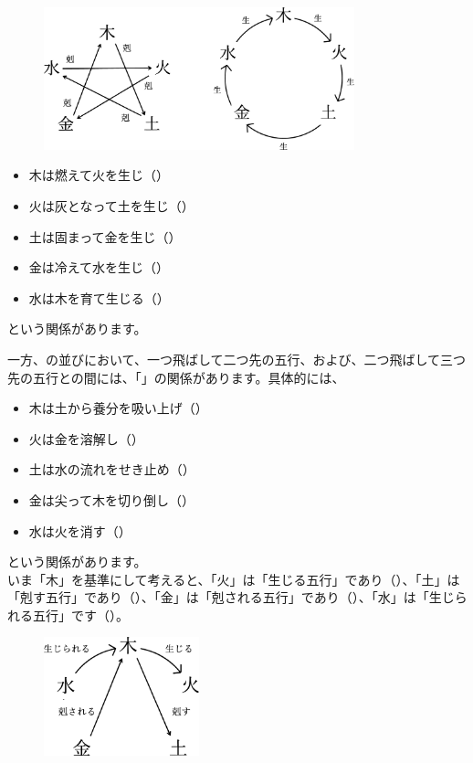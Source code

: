 \documentclass[a5paper,11pt,dvipdfmx]{tarticle}
\begin{document}
\begin{figure}
  \includegraphics[width=90mm,angle=90]{figs/figure5-1.eps}
\end{figure}

\begin{itemize}
\item 木は燃えて火を生じ（）
\item 火は灰となって土を生じ（）
\item 土は固まって金を生じ（）
\item 金は冷えて水を生じ（）
\item 水は木を育て生じる（）
\end{itemize}
という関係があります。

一方、の並びにおいて、一つ飛ばして二つ先の五行、および、二つ飛ばして三つ先の五行との間には、「」の関係があります。具体的には、
\begin{itemize}
\item 木は土から養分を吸い上げ（）
\item 火は金を溶解し（）
\item 土は水の流れをせき止め（）
\item 金は尖って木を切り倒し（）
\item 水は火を消す（）
\end{itemize}  
という関係があります。\\

いま「木」を基準にして考えると、「火」は「生じる五行」であり（）、「土」は「剋す五行」であり（）、「金」は「剋される五行」であり（）、「水」は「生じられる五行」です（）。

\begin{figure}[h]
  \includegraphics[width=45mm,angle=90]{figs/figure5-3.eps}
\end{figure}
\end{document}
